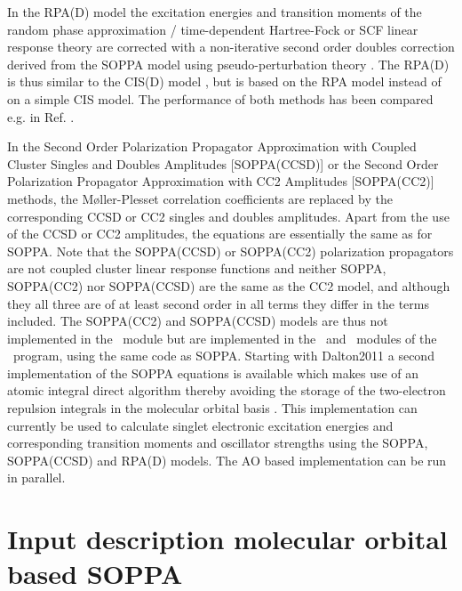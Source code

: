 In the RPA(D) model \cite{spas025} the excitation
energies and transition moments of the random phase approximation /
time-dependent Hartree-Fock or SCF linear response theory are corrected
with a non-iterative second order doubles correction derived from the
SOPPA model using pseudo-perturbation theory
\cite{Christiansen:PERTURBATIVE_TRIPLES}. The RPA(D) is thus similar to
the CIS(D) model \cite{Head-Gordon:94},
 but is based on the RPA model instead of on a simple CIS
model. The performance of both methods has been compared e.g. in Ref.
\cite{spas089}.

In the Second Order Polarization Propagator Approximation with Coupled
Cluster Singles and Doubles Amplitudes [SOPPA(CCSD)] \cite{soppaccsd,
ekdspasjpca102, tejospastcan100, ctocd, spas089}  or
the Second Order Polarization Propagator Approximation with CC2
Amplitudes [SOPPA(CC2)] \cite{spas097} methods, the
M{\o}ller-Plesset correlation coefficients are replaced by the
corresponding CCSD or CC2 singles and doubles amplitudes. Apart from
the use of the CCSD or CC2 amplitudes, the equations are essentially
the same as for SOPPA. Note that the SOPPA(CCSD) or SOPPA(CC2)
polarization propagators are not coupled cluster linear response
functions and neither SOPPA, SOPPA(CC2) nor SOPPA(CCSD) are the same as
the CC2 model, and although they all three are of at least second order
in all terms they differ in the terms included. The SOPPA(CC2) and
SOPPA(CCSD) models are thus not implemented in the \cc\ module but are
implemented in the \response\ and \abacus\ modules of the \dalton\ program,
using the same code as SOPPA. Starting with Dalton2011 a second
implementation of the SOPPA equations is available which makes use of
an atomic integral direct algorithm thereby avoiding the storage of the
two-electron repulsion integrals in the molecular orbital basis
\cite{spas025, spas037, spas089}. This implementation can currently be
used to calculate singlet electronic excitation energies and
corresponding transition moments and oscillator strengths using the
SOPPA, SOPPA(CCSD) and RPA(D) models. The AO based 
implementation can be run in parallel.


\section{Input description molecular orbital based SOPPA}\label{sec:soppainput}


